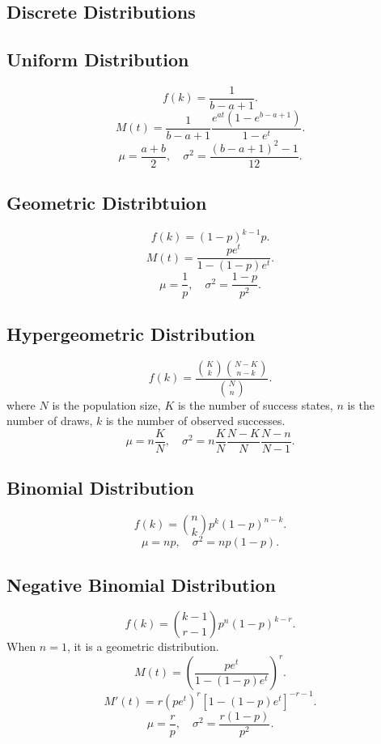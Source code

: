 \documentclass[10pt,landscape,a4paper]{article}
\begin{document}
\small
\begin{multicols*}{5}
        \section*{Discrete Distributions}
        \subsection*{Uniform Distribution}
        \[
                f(k) = \frac{1}{b-a+1}
        .\]
        \[
                M(t) = \frac{1}{b-a+1} \frac{e^{at}(1-e^{b-a+1})}{1-e^t}
        .\] 
        \[
                \mu = \frac{a+b}{2}, \quad 
                \sigma^2 = \frac{(b-a+1)^2-1}{12}
        .\]
        \subsection*{Geometric Distribtuion}
        \[
                f(k) = (1-p)^{k-1}p
        .\] 
        \[
                M(t) = \frac{pe^t}{1-(1-p)e^t}
        .\]
        \[
                \mu = \frac{1}{p}, \quad
                \sigma^2 = \frac{1-p}{p^2}
        .\] 
        
        \subsection*{Hypergeometric Distribution}
        \[
                f(k) = \frac{\binom{K}{k} \binom{N-K}{n-k}}{\binom{N}{n}}
        .\]
        where $N$ is the population size,
        $K$ is the number of success states,
        $n$ is the number of draws,
        $k$ is the number of observed successes.
        \[
                \mu = n \frac{K}{N}, \quad 
                \sigma^2 = n \frac{K}{N} \frac{N-K}{N} \frac{N-n}{N-1} 
        .\]
        \subsection*{Binomial Distribution}
        \[
                f(k) = \binom{n}{k}p^k(1-p)^{n-k}
        .\]
        \[
                \mu = np, \quad
                \sigma^2 = np(1-p)
        .\] 
        \subsection*{Negative Binomial Distribution}
        \[
                f(k) = \binom{k-1}{r-1}p^n(1-p)^{k-r}
        .\]
        When $n=1$, it is a geometric distribution.
        \[
                M(t) = \left( \frac{pe^t}{1-(1-p)e^t}\right)^r 
        .\]
        \[
                M'(t) = r(pe^t)^r[1-(1-p)e^t]^{-r-1}
        .\] 
        \[
                \mu = \frac{r}{p}, \quad
                \sigma^2 = \frac{r(1-p)}{p^2}
        .\] 

\end{multicols*}
\end{document}
